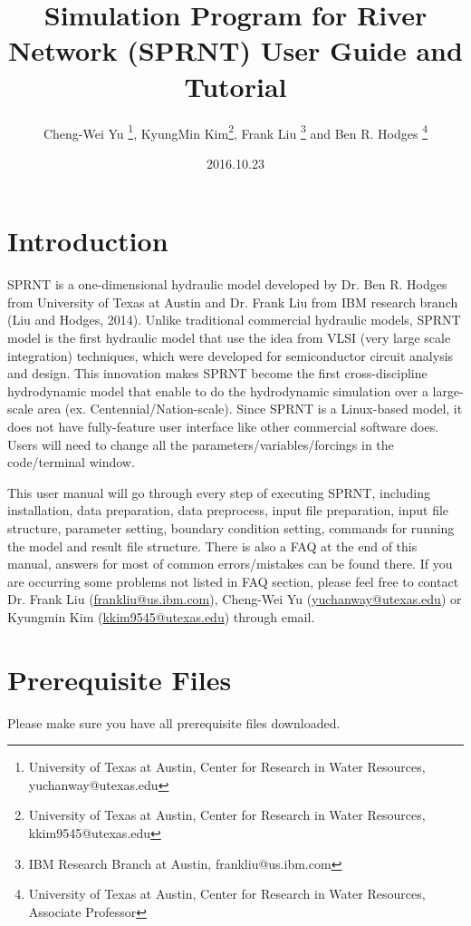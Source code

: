 \documentclass[12pt, letterpaper]{article}
\title{Simulation Program for River Network (SPRNT) User Guide and Tutorial}
\author{Cheng-Wei Yu \thanks{University of Texas at Austin, Center for Research in Water Resources, yuchanway@utexas.edu}, KyungMin Kim\thanks{University of Texas at Austin, Center for Research in Water Resources, kkim9545@utexas.edu}, Frank Liu \thanks{IBM Research Branch at Austin, frankliu@us.ibm.com} and Ben R. Hodges \thanks{University of Texas at Austin, Center for Research in Water Resources, Associate Professor}}
\date{2016.10.23}
\begin{document}
\maketitle


\newpage



\section*{Introduction}
\label{sec:1}
\indent SPRNT is a one-dimensional hydraulic model developed by Dr. Ben R. Hodges from University of Texas at Austin and Dr. Frank Liu from IBM research branch (Liu and Hodges, 2014). Unlike traditional commercial hydraulic models, SPRNT model is the first hydraulic model that   use the idea from VLSI (very large scale integration) techniques, which were developed for semiconductor circuit analysis and design. This innovation makes SPRNT become the first cross-discipline hydrodynamic model that enable to do the hydrodynamic simulation over a large-scale area (ex. Centennial/Nation-scale). Since SPRNT is a Linux-based model, it does not have fully-feature user interface like other commercial software does. Users will need to change all the parameters/variables/forcings in the code/terminal window.

This user manual will go through every step of executing SPRNT, including installation, data preparation, data preprocess, input file preparation, input file structure, parameter setting, boundary condition setting, commands for running the model and result file structure. There is also a FAQ at the end of this manual, answers for most of common errors/mistakes can be found there. If you are occurring some problems not listed in FAQ section, please feel free to contact Dr. Frank Liu (\url{frankliu@us.ibm.com}), Cheng-Wei Yu (\url{yuchanway@utexas.edu}) or Kyungmin Kim (\url{kkim9545@utexas.edu}) through email. 
\newpage




\section{Prerequisite Files}%
\label{sec:BS}
Please make sure you have all prerequisite files downloaded.
\end{document}
